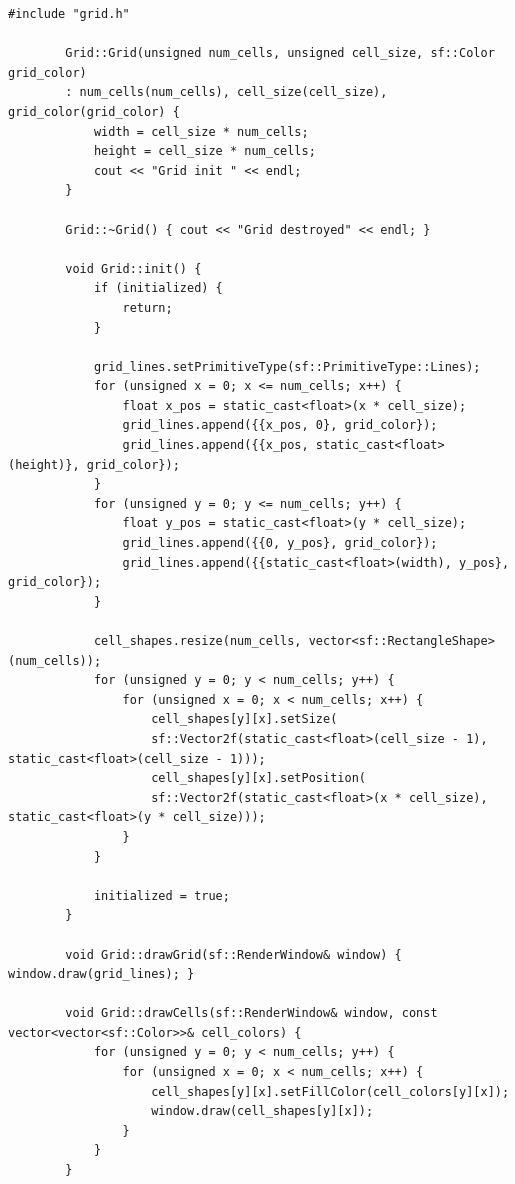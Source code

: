 \documentclass[14pt,a4paper]{extarticle}
\theoremstyle{plain}
\begin{document}
	\begin{lstlisting}[title=grid.cpp, gobble=16, breaklines=true, showspaces=false, showtabs=false, breakatwhitespace=true]
		#include "grid.h"
		
		Grid::Grid(unsigned num_cells, unsigned cell_size, sf::Color grid_color)
		: num_cells(num_cells), cell_size(cell_size), grid_color(grid_color) {
			width = cell_size * num_cells;
			height = cell_size * num_cells;
			cout << "Grid init " << endl;
		}
		
		Grid::~Grid() { cout << "Grid destroyed" << endl; }
		
		void Grid::init() {
			if (initialized) {
				return;
			}
			
			grid_lines.setPrimitiveType(sf::PrimitiveType::Lines);
			for (unsigned x = 0; x <= num_cells; x++) {
				float x_pos = static_cast<float>(x * cell_size);
				grid_lines.append({{x_pos, 0}, grid_color});
				grid_lines.append({{x_pos, static_cast<float>(height)}, grid_color});
			}
			for (unsigned y = 0; y <= num_cells; y++) {
				float y_pos = static_cast<float>(y * cell_size);
				grid_lines.append({{0, y_pos}, grid_color});
				grid_lines.append({{static_cast<float>(width), y_pos}, grid_color});
			}
			
			cell_shapes.resize(num_cells, vector<sf::RectangleShape>(num_cells));
			for (unsigned y = 0; y < num_cells; y++) {
				for (unsigned x = 0; x < num_cells; x++) {
					cell_shapes[y][x].setSize(
					sf::Vector2f(static_cast<float>(cell_size - 1), static_cast<float>(cell_size - 1)));
					cell_shapes[y][x].setPosition(
					sf::Vector2f(static_cast<float>(x * cell_size), static_cast<float>(y * cell_size)));
				}
			}
			
			initialized = true;
		}
		
		void Grid::drawGrid(sf::RenderWindow& window) { window.draw(grid_lines); }
		
		void Grid::drawCells(sf::RenderWindow& window, const vector<vector<sf::Color>>& cell_colors) {
			for (unsigned y = 0; y < num_cells; y++) {
				for (unsigned x = 0; x < num_cells; x++) {
					cell_shapes[y][x].setFillColor(cell_colors[y][x]);
					window.draw(cell_shapes[y][x]);
				}
			}
		}
	\end{lstlisting}
	
\end{document}
